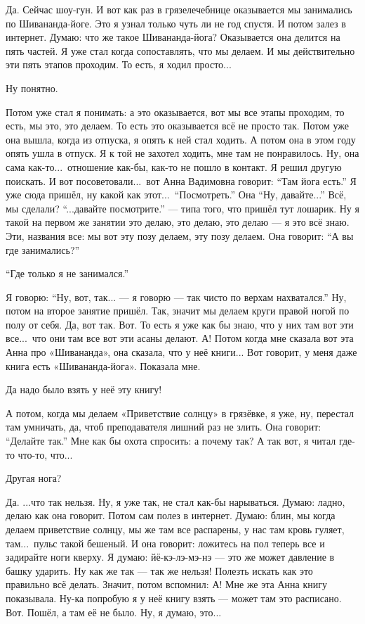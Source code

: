 \I
Да. Сейчас шоу-гун.
И вот как раз в грязелечебнице оказывается мы занимались по Шивананда-йоге.
Это я узнал только чуть ли не год спустя. И потом залез в интернет.
Думаю: что же такое Шивананда-йога?
Оказывается она делится на пять частей.
Я уже стал когда сопоставлять, что мы делаем.
И мы действительно эти пять этапов проходим.
То есть, я ходил просто...

\M
Ну понятно.

\I
Потом уже стал я понимать: а это оказывается, вот мы все этапы проходим, то есть, мы это, это делаем.
То есть это оказывается всё не просто так.
Потом уже она вышла, когда из отпуска, я опять к ней стал ходить.
А потом она в этом году опять ушла в отпуск.
Я к той не захотел ходить, мне там не понравилось.
Ну, она сама как-то...\ отношение как-бы,
как-то не пошло в контакт.
Я решил другую поискать. И вот посоветовали...\ вот Анна Вадимовна говорит: ``Там йога
есть.'' Я уже сюда пришёл, ну какой как этот...\ ``Посмотреть.'' Она ``Ну, давайте...''
Всё, мы сделали? ``...давайте посмотрите.'' --- типа того, что пришёл тут лошарик.
Ну я такой на первом же занятии это делаю, это делаю, это делаю --- я это всё знаю.
Эти, названия все: мы вот эту позу делаем, эту позу делаем. Она говорит:
``А вы где занимались?''

\M
``Где только я не занимался.''

\I
Я говорю: ``Ну, вот, так... --- я говорю --- так чисто по верхам
нахватался.'' Ну, потом на второе занятие пришёл.
Так, значит мы делаем круги
правой ногой по полу от себя. Да, вот так.
Вот. То есть я уже как бы знаю, что у них там вот эти все...\ что они там все вот эти асаны делают.
А\null! Потом когда мне сказала вот эта Анна про «Шивананда», она сказала,
что у неё книги...
Вот говорит, у меня даже книга есть «Шивананда-йога». Показала мне.

\M
Да надо было взять у неё эту книгу!

\I
А потом, когда мы делаем «Приветствие солнцу» в грязёвке, я уже, ну, перестал там умничать, да,
чтоб преподавателя лишний раз не злить.
Она говорит: ``Делайте так.''
Мне как бы охота спросить: а почему так?
А так вот, я читал где-то что-то, что...

\M
Другая нога?

\I
Да. ...что так нельзя. Ну, я уже так, не стал как-бы нарываться. Думаю: ладно,
делаю как она говорит. Потом сам полез в интернет. Думаю: блин, мы когда делаем приветствие
солнцу, мы же там все распарены, у нас там кровь гуляет, там...\
пульс такой бешеный. И она говорит: ложитесь на пол теперь все и задирайте ноги кверху.
Я думаю: йё-кэ-лэ-мэ-нэ --- это
же может давление в башку ударить. Ну как же так --- так же нельзя!
Полезть искать как это правильно всё делать. Значит, потом вспомнил:
А! Мне же эта Анна книгу показывала.
Ну-ка попробую я у неё
книгу взять --- может там это расписано.
Вот.
Пошёл, а там её не было. Ну, я думаю, это...

